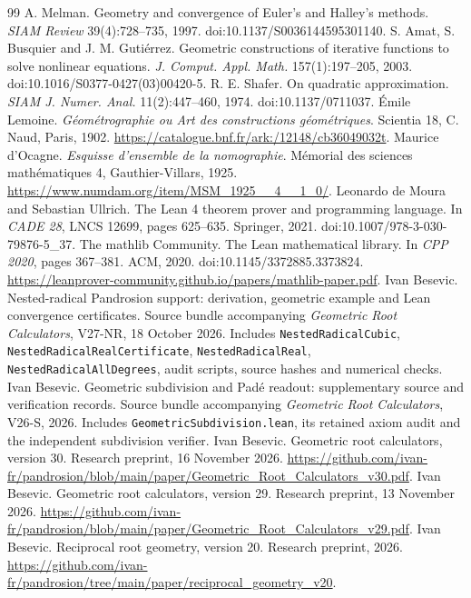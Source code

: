\begin{thebibliography}{99}
 A. Melman. Geometry and convergence of Euler's and Halley's methods. \emph{SIAM
Review} 39(4):728--735, 1997. doi:10.1137/S0036144595301140.
 S. Amat, S. Busquier and J. M. Guti\'errez. Geometric constructions of iterative
functions to solve nonlinear equations. \emph{J. Comput. Appl. Math.} 157(1):197--205, 2003.
doi:10.1016/S0377-0427(03)00420-5.
 R. E. Shafer. On quadratic approximation. \emph{SIAM J. Numer. Anal.}
11(2):447--460, 1974. doi:10.1137/0711037.
 \'Emile Lemoine. \emph{G\'eom\'etrographie ou Art des constructions
g\'eom\'etriques}. Scientia 18, C. Naud, Paris, 1902.
\url{https://catalogue.bnf.fr/ark:/12148/cb36049032t}.
 Maurice d'Ocagne. \emph{Esquisse d'ensemble de la nomographie}. M\'emorial des
sciences math\'ematiques 4, Gauthier-Villars, 1925.
\url{https://www.numdam.org/item/MSM_1925__4__1_0/}.
 Leonardo de Moura and Sebastian Ullrich. The Lean 4 theorem prover and programming
language. In \emph{CADE 28}, LNCS 12699, pages 625--635. Springer, 2021.
doi:10.1007/978-3-030-79876-5\_37.
 The mathlib Community. The Lean mathematical library. In \emph{CPP 2020}, pages
367--381. ACM, 2020. doi:10.1145/3372885.3373824.
\url{https://leanprover-community.github.io/papers/mathlib-paper.pdf}.
 Ivan Besevic. Nested-radical Pandrosion support: derivation, geometric example and
Lean convergence certificates. Source bundle accompanying \emph{Geometric Root Calculators}, V27-NR,
18 October 2026. Includes \texttt{NestedRadicalCubic}, \texttt{NestedRadicalRealCertificate},
\texttt{NestedRadicalReal}, \texttt{NestedRadicalAllDegrees}, audit scripts, source hashes and
numerical checks.
 Ivan Besevic. Geometric subdivision and Pad\'e readout: supplementary source and
verification records. Source bundle accompanying \emph{Geometric Root Calculators}, V26-S, 2026.
Includes \texttt{GeometricSubdivision.lean}, its retained axiom audit and the independent subdivision
verifier.
 Ivan Besevic. Geometric root calculators, version 30. Research preprint, 16 November
2026. \url{https://github.com/ivan-fr/pandrosion/blob/main/paper/Geometric_Root_Calculators_v30.pdf}.
 Ivan Besevic. Geometric root calculators, version 29. Research preprint, 13 November
2026. \url{https://github.com/ivan-fr/pandrosion/blob/main/paper/Geometric_Root_Calculators_v29.pdf}.
 Ivan Besevic. Reciprocal root geometry, version 20. Research preprint, 2026.
\url{https://github.com/ivan-fr/pandrosion/tree/main/paper/reciprocal_geometry_v20}.

\end{thebibliography}
